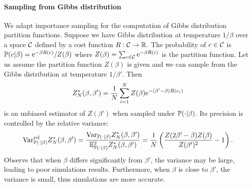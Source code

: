 \paragraph{Sampling from Gibbs distribution} 
We adapt importance sampling for
the computation of Gibbs distribution partition functions. Suppose we have Gibbs
distribution at temperature $1/\beta$ over a space ${\cal C}$ defined by a cost
function $R: {\cal C} \to \mathbb{R}$. The probability of $c\in {\cal C}$ is $
{\mathbb{P}}(c|\beta) = \mathrm{e}^{-\beta R(c)}/Z(\beta) $ where
$Z(\beta)=\sum_{c\in{\cal C}}\mathrm{e}^{-\beta R(c)}$ is the partition function. Let us
assume the partition function $Z(\beta)$ is given and we can sample from the
Gibbs distribution at temperature $1/\beta'$.  Then
\begin{equation}\label{importance_sampling}
    Z^*_N(\beta, \beta') = \frac{1}{N}\sum_{i=1}^N Z(\beta) \mathrm{e}^{-(\beta'-\beta)R(c_i)}
\end{equation}
is an unbiased estimator of $Z(\beta')$ when sampled under ${\mathbb{P}}(\cdot|\beta)$.
Its precision is controlled by the relative variance:
\begin{equation}
    {\mathrm{Var}}^{\text{rel}}_{{\mathbb{P}}(\cdot|\beta)} Z^*_N(\beta, \beta')
        = \frac{{\mathrm{Var}}_{{\mathbb{P}}(\cdot|\beta)} Z^*_N(\beta, \beta')}{{\mathbb{E}}^2_{{\mathbb{P}}(\cdot|\beta)}
            Z^*_N(\beta, \beta')}
        = \frac{1}{N}\left(\frac{Z(2\beta'-\beta)Z(\beta)}{Z(\beta')^2} - 1 \right).
\end{equation}
Observe that when $\beta$ differs significantly from $\beta'$, 
the variance may be large, leading to poor simulations results.
Furthermore, when $\beta$ is close to $\beta'$, the variance is small, 
thus simulations are more accurate.

